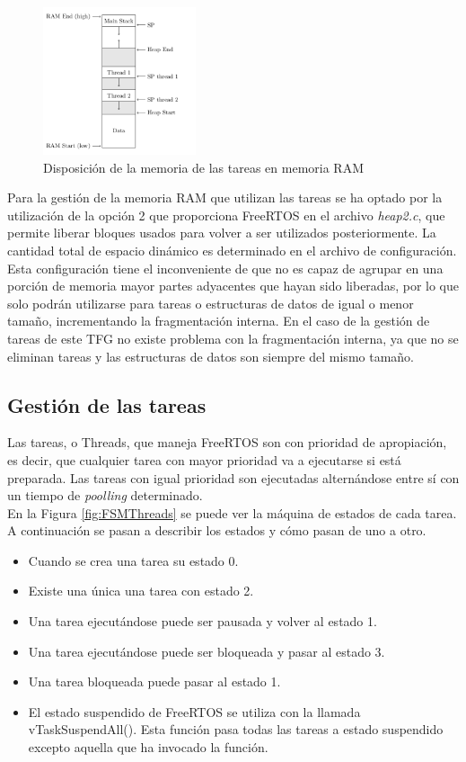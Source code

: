 \begin{figure}[!h]
\begin{center}
\includegraphics[width=0.4\textwidth]{figs/RAM.png}
\caption{Disposición de la memoria de las tareas en memoria RAM}
\label{fig:RAM}
\end{center}
\end{figure}

Para la gestión de la memoria RAM que utilizan las tareas se ha optado por la utilización de la opción 2 que proporciona FreeRTOS en el archivo \textit{heap2.c}, que permite liberar bloques usados para volver a ser utilizados posteriormente. La cantidad total de espacio dinámico es determinado en el archivo de configuración. Esta configuración tiene el inconveniente de que no es capaz de agrupar en una porción de memoria mayor partes adyacentes que hayan sido liberadas, por lo que solo podrán utilizarse para tareas o estructuras de datos de igual o menor tamaño, incrementando la fragmentación interna. En el caso de la gestión de tareas de este TFG no existe problema con la fragmentación interna, ya que no se eliminan tareas y las estructuras de datos son siempre del mismo tamaño.\\

\subsection{Gestión de las tareas}
Las tareas, o Threads, que maneja FreeRTOS son con prioridad de apropiación, es decir, que cualquier tarea con mayor prioridad va a ejecutarse si está preparada. Las tareas con igual prioridad son ejecutadas alternándose entre sí con un tiempo de \textit{poolling} determinado.\\

En la Figura \ref{fig:FSMThreads} se puede ver la máquina de estados de cada tarea. A continuación se pasan a describir los estados y cómo pasan de uno a otro.
\begin{itemize}
\item Cuando se crea una tarea su estado 0.
\item Existe una única una tarea con estado 2.
\item Una tarea ejecutándose puede ser pausada y volver al estado 1.
\item Una tarea ejecutándose puede ser bloqueada y pasar al estado 3.
\item Una tarea bloqueada puede pasar al estado 1.
\item El estado suspendido de FreeRTOS se utiliza con la llamada vTaskSuspendAll(). Esta función pasa todas las tareas a estado suspendido excepto aquella que ha invocado la función.\\
\end{itemize}

